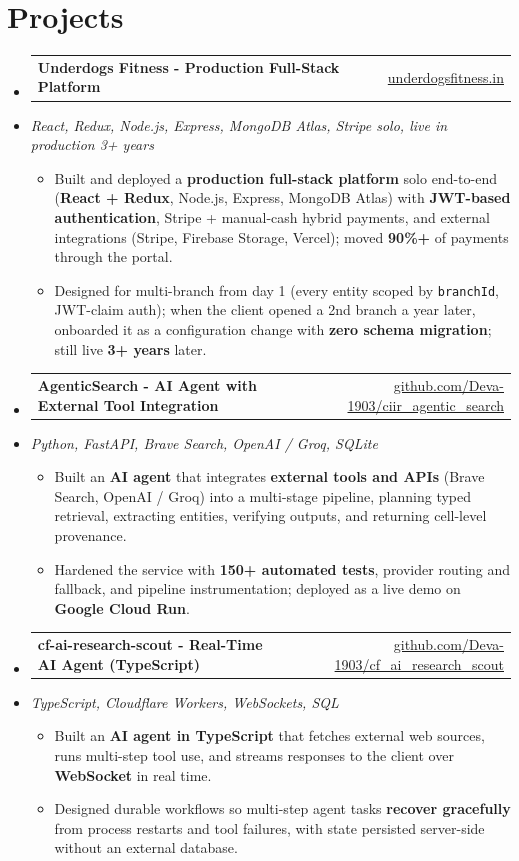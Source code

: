 \documentclass[letterpaper,10pt]{article}
\makeatletter
\newcommand{\resumeItem}[1]{
  \item\small{#1\vspace{-1pt}}
}
\newcommand{\resumeProjectHeading}[2]{
    \item
    \begin{tabular*}{0.985\textwidth}[t]{l@{\extracolsep{\fill}}r}
      \small\textbf{#1} & \small #2 \\
    \end{tabular*}\vspace{-5pt}
}
\newcommand{\resumeProjectSubheading}[1]{
  \vspace{-2pt}\item[] {\small\textcolor{ResumeSlate}{\emph{#1}}}\vspace{-3pt}
}
\newcommand{\resumeSubHeadingListStart}{\begin{itemize}[leftmargin=0.0in, label={}, itemsep=2pt, topsep=2pt]}
\newcommand{\resumeSubHeadingListEnd}{\end{itemize}}
\newcommand{\resumeItemListStart}{\begin{itemize}[leftmargin=0.18in, itemsep=2pt, topsep=1pt]}
\newcommand{\resumeItemListEnd}{\end{itemize}\vspace{-4pt}}
\makeatother
\begin{document}
\section{Projects}
\resumeSubHeadingListStart
  \resumeProjectHeading
    {Underdogs Fitness - Production Full-Stack Platform}
    {\href{https://www.underdogsfitness.in/}{underdogsfitness.in}}
  \resumeProjectSubheading{React, Redux, Node.js, Express, MongoDB Atlas, Stripe \enspace\textbar\enspace solo, live in production 3+ years}
    \resumeItemListStart
      \resumeItem{Built and deployed a \textbf{production full-stack platform} solo end-to-end (\textbf{React + Redux}, Node.js, Express, MongoDB Atlas) with \textbf{JWT-based authentication}, Stripe + manual-cash hybrid payments, and external integrations (Stripe, Firebase Storage, Vercel); moved \textbf{90\%+} of payments through the portal.}
      \resumeItem{Designed for multi-branch from day 1 (every entity scoped by \texttt{branchId}, JWT-claim auth); when the client opened a 2nd branch a year later, onboarded it as a configuration change with \textbf{zero schema migration}; still live \textbf{3+ years} later.}
    \resumeItemListEnd
  \resumeProjectHeading
    {AgenticSearch - AI Agent with External Tool Integration}
    {\href{https://github.com/Deva-1903/ciir_agentic_search}{github.com/Deva-1903/ciir\_agentic\_search}}
  \resumeProjectSubheading{Python, FastAPI, Brave Search, OpenAI / Groq, SQLite}
    \resumeItemListStart
      \resumeItem{Built an \textbf{AI agent} that integrates \textbf{external tools and APIs} (Brave Search, OpenAI / Groq) into a multi-stage pipeline, planning typed retrieval, extracting entities, verifying outputs, and returning cell-level provenance.}
      \resumeItem{Hardened the service with \textbf{150+ automated tests}, provider routing and fallback, and pipeline instrumentation; deployed as a live demo on \textbf{Google Cloud Run}.}
    \resumeItemListEnd
  \resumeProjectHeading
    {cf-ai-research-scout - Real-Time AI Agent (TypeScript)}
    {\href{https://github.com/Deva-1903/cf_ai_research_scout}{github.com/Deva-1903/cf\_ai\_research\_scout}}
  \resumeProjectSubheading{TypeScript, Cloudflare Workers, WebSockets, SQL}
    \resumeItemListStart
      \resumeItem{Built an \textbf{AI agent in TypeScript} that fetches external web sources, runs multi-step tool use, and streams responses to the client over \textbf{WebSocket} in real time.}
      \resumeItem{Designed durable workflows so multi-step agent tasks \textbf{recover gracefully} from process restarts and tool failures, with state persisted server-side without an external database.}
    \resumeItemListEnd
\resumeSubHeadingListEnd
\vspace{-4pt}
\end{document}

